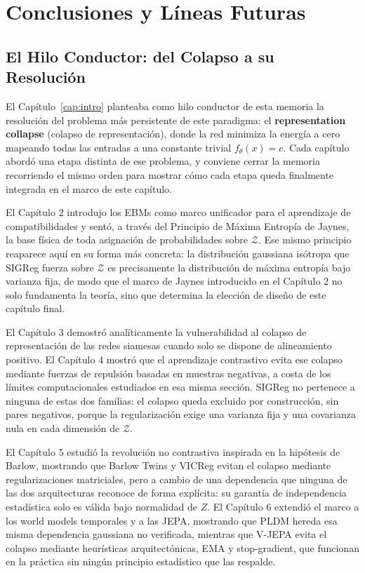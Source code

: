 \chapter{Conclusiones y Líneas Futuras}
\label{cap:conclusiones}

\section{El Hilo Conductor: del Colapso a su Resolución}
\label{sec:cumplimiento_objetivos}

El Capítulo~\ref{cap:intro} planteaba como hilo conductor de esta memoria la resolución del problema más persistente de este paradigma: el \textbf{representation collapse} (colapso de representación), donde la red minimiza la energía a cero mapeando todas las entradas a una constante trivial $f_{\theta}(x) = c$. Cada capítulo abordó una etapa distinta de ese problema, y conviene cerrar la memoria recorriendo el mismo orden para mostrar cómo cada etapa queda finalmente integrada en el marco de este capítulo.

El Capítulo 2 introdujo los EBMs como marco unificador para el aprendizaje de compatibilidades y sentó, a través del Principio de Máxima Entropía de Jaynes, la base física de toda asignación de probabilidades sobre $\mathcal{Z}$. Ese mismo principio reaparece aquí en su forma más concreta: la distribución gaussiana isótropa que SIGReg fuerza sobre $\mathcal{Z}$ es precisamente la distribución de máxima entropía bajo varianza fija, de modo que el marco de Jaynes introducido en el Capítulo 2 no solo fundamenta la teoría, sino que determina la elección de diseño de este capítulo final.

El Capítulo 3 demostró analíticamente la vulnerabilidad al colapso de representación de las redes siamesas cuando solo se dispone de alineamiento positivo. El Capítulo 4 mostró que el aprendizaje contrastivo evita ese colapso mediante fuerzas de repulsión basadas en muestras negativas, a costa de los límites computacionales estudiados en esa misma sección. SIGReg no pertenece a ninguna de estas dos familias: el colapso queda excluido por construcción, sin pares negativos, porque la regularización exige una varianza fija y una covarianza nula en cada dimensión de $\mathcal{Z}$.

El Capítulo 5 estudió la revolución no contrastiva inspirada en la hipótesis de Barlow, mostrando que Barlow Twins y VICReg evitan el colapso mediante regularizaciones matriciales, pero a cambio de una dependencia que ninguna de las dos arquitecturas reconoce de forma explícita: su garantía de independencia estadística solo es válida bajo normalidad de $Z$. El Capítulo 6 extendió el marco a los world models temporales y a las JEPA, mostrando que PLDM hereda esa misma dependencia gaussiana no verificada, mientras que V-JEPA evita el colapso mediante heurísticas arquitectónicas, EMA y stop-gradient, que funcionan en la práctica sin ningún principio estadístico que las respalde.


